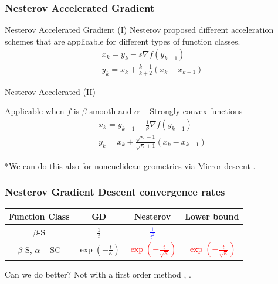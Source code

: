 \documentclass{beamer}
\newcommand\Fontvi{\fontsize{8}{7.2}\selectfont}
\newcommand\fontbig{\fontsize{15}{7.2}\selectfont}
\begin{document}
\begin{frame}

\frametitle{Nesterov Accelerated Gradient}


\begin{block}{Nesterov Accelerated Gradient (I)}
Nesterov proposed different acceleration schemes that are applicable for different types of function classes. 
\begin{align}
    x_k = y_k - s \nabla f(y_{k-1}) \\
    y_k = x_k + \frac{k-1}{k+2}(x_k - x_{k-1})
\end{align}
\end{block}

\begin{block}{Nesterov Accelerated (II)}

Applicable when $f$ is $\beta$-smooth and $\alpha-$Strongly convex functions
\begin{align}
x_k = y_{k-1} - \frac{1}{\beta} \nabla f(y_{k-1})\\
y_k = x_k + \frac{\sqrt{\kappa} - 1}{\sqrt{\kappa}+1} (x_k - x_{k-1})
\end{align}

\end{block}

\Fontvi
*We can do this also for noneuclidean geometries via Mirror descent \cite{DBLP:journals/ftml/Bubeck15}.  

\end{frame}



\begin{frame}
\frametitle{Nesterov Gradient Descent convergence rates}
\fontbig
\begin{center}


 \begin{tabular}{||c c c c ||} 
 \hline
 Function Class   & GD  &  Nesterov   {& Lower bound }\\ [0.5ex] 
 \hline\hline
 $\beta$-S & $\frac{1}{t}$ & \textcolor{blue}{$\frac{1}{t^2}$} & \onslide<2->{ \textcolor{blue}{$\frac{1}{t^2}$} } \\ [1ex]
 \hline
 $\beta$-S, $\alpha-$SC  &  $\exp\left(-\frac{t}{\kappa}\right)$ & \textcolor{red}{$\exp\left(-\frac{t}{\sqrt{\kappa}}  \right)$} &  {\textcolor{red}{ $\exp\left(-\frac{t}{\sqrt{\kappa}}  \right)$} }\\ [1ex]
 \hline
\end{tabular}



\end{center}



\begin{block}{Can we do better?}
 {Not with a first order method \cite{DBLP:journals/ftml/Bubeck15}, \cite{nesterov2004introductory}.}
\end{block}

\end{frame}
\end{document}
